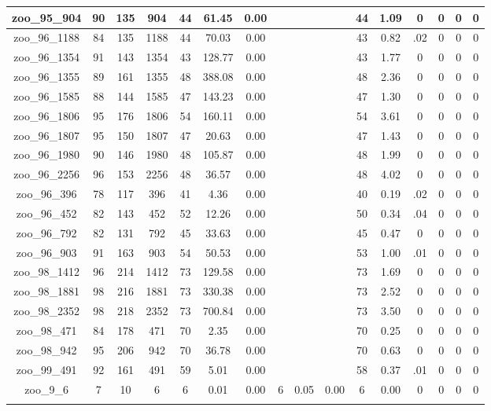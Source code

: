 \begin{landscape}
\begin{longtable}{|c|c|c|c|c|c|c|c|c|c|c|c|c|c|c|c|}
zoo\_95\_904 & 90 & 135 & 904 & 44 & 61.45 & 0.00 &  &  &  & 44 & 1.09 & 0 & 0 & 0 & 0 \\ \hline 
zoo\_96\_1188 & 84 & 135 & 1188 & 44 & 70.03 & 0.00 &  &  &  & 43 & 0.82 & .02 & 0 & 0 & 0 \\ \hline 
zoo\_96\_1354 & 91 & 143 & 1354 & 43 & 128.77 & 0.00 &  &  &  & 43 & 1.77 & 0 & 0 & 0 & 0 \\ \hline 
zoo\_96\_1355 & 89 & 161 & 1355 & 48 & 388.08 & 0.00 &  &  &  & 48 & 2.36 & 0 & 0 & 0 & 0 \\ \hline 
zoo\_96\_1585 & 88 & 144 & 1585 & 47 & 143.23 & 0.00 &  &  &  & 47 & 1.30 & 0 & 0 & 0 & 0 \\ \hline 
zoo\_96\_1806 & 95 & 176 & 1806 & 54 & 160.11 & 0.00 &  &  &  & 54 & 3.61 & 0 & 0 & 0 & 0 \\ \hline 
zoo\_96\_1807 & 95 & 150 & 1807 & 47 & 20.63 & 0.00 &  &  &  & 47 & 1.43 & 0 & 0 & 0 & 0 \\ \hline 
zoo\_96\_1980 & 90 & 146 & 1980 & 48 & 105.87 & 0.00 &  &  &  & 48 & 1.99 & 0 & 0 & 0 & 0 \\ \hline 
zoo\_96\_2256 & 96 & 153 & 2256 & 48 & 36.57 & 0.00 &  &  &  & 48 & 4.02 & 0 & 0 & 0 & 0 \\ \hline 
zoo\_96\_396 & 78 & 117 & 396 & 41 & 4.36 & 0.00 &  &  &  & 40 & 0.19 & .02 & 0 & 0 & 0 \\ \hline 
zoo\_96\_452 & 82 & 143 & 452 & 52 & 12.26 & 0.00 &  &  &  & 50 & 0.34 & .04 & 0 & 0 & 0 \\ \hline 
zoo\_96\_792 & 82 & 131 & 792 & 45 & 33.63 & 0.00 &  &  &  & 45 & 0.47 & 0 & 0 & 0 & 0 \\ \hline 
zoo\_96\_903 & 91 & 163 & 903 & 54 & 50.53 & 0.00 &  &  &  & 53 & 1.00 & .01 & 0 & 0 & 0 \\ \hline 
zoo\_98\_1412 & 96 & 214 & 1412 & 73 & 129.58 & 0.00 &  &  &  & 73 & 1.69 & 0 & 0 & 0 & 0 \\ \hline 
zoo\_98\_1881 & 98 & 216 & 1881 & 73 & 330.38 & 0.00 &  &  &  & 73 & 2.52 & 0 & 0 & 0 & 0 \\ \hline 
zoo\_98\_2352 & 98 & 218 & 2352 & 73 & 700.84 & 0.00 &  &  &  & 73 & 3.50 & 0 & 0 & 0 & 0 \\ \hline 
zoo\_98\_471 & 84 & 178 & 471 & 70 & 2.35 & 0.00 &  &  &  & 70 & 0.25 & 0 & 0 & 0 & 0 \\ \hline 
zoo\_98\_942 & 95 & 206 & 942 & 70 & 36.78 & 0.00 &  &  &  & 70 & 0.63 & 0 & 0 & 0 & 0 \\ \hline 
zoo\_99\_491 & 92 & 161 & 491 & 59 & 5.01 & 0.00 &  &  &  & 58 & 0.37 & .01 & 0 & 0 & 0 \\ \hline 
zoo\_9\_6 & 7 & 10 & 6 & 6 & 0.01 & 0.00 & 6 & 0.05 & 0.00 & 6 & 0.00 & 0 & 0 & 0 & 0 \\ \hline 
\label{tbl:results}
\end{longtable}
\end{landscape}
